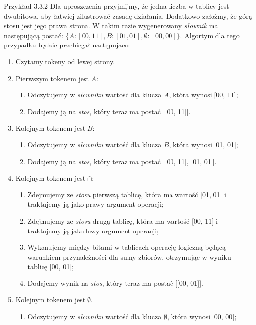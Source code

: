 \documentclass{SGGW-thesis}
\begin{document}
\begin{paragraph}{Przykład 3.3.2\label{ex:3.3.2}}
    Dla uproszczenia przyjmijmy, że jedna liczba w tablicy jest dwubitowa, aby łatwiej zilustrować zasadę działania. Dodatkowo załóżmy, że górą stosu jest jego prawa strona. W takim razie wygenerowany \emph{słownik} ma następującą postać:
    $\{ A: \left[ 00, 11 \right], B: \left[ 01, 01 \right], \emptyset: \left[00, 00 \right]\}$. Algortym dla tego przypadku będzie przebiegał następujaco:
    \begin{enumerate}
        \item Czytamy tokeny od lewej strony.
        \item Pierwszym tokenem jest $A$:
        \begin{enumerate}
            \item Odczytujemy w \emph{słowniku} wartość dla klucza $A$, która wynosi [00, 11];
            \item Dodajemy ją na \emph{stos}, który teraz ma postać [[00, 11]].
        \end{enumerate}
        \item Kolejnym tokenem jest $B$:
        \begin{enumerate}
            \item Odczytujemy w \emph{słowniku} wartość dla klucza $B$, która wynosi [01, 01];
            \item Dodajemy ją na \emph{stos}, który teraz ma postać [[00, 11], [01, 01]].
        \end{enumerate}
        \item Kolejnym tokenem jest $\cap$:
        \begin{enumerate}
            \item Zdejmujemy ze \emph{stosu} pierwszą tablicę, która ma wartość [01, 01] i traktujemy ją jako prawy argument operacji;
            \item Zdejmujemy ze \emph{stosu} drugą tablicę, która ma wartość [00, 11] i traktujemy ją jako lewy argument operacji;
            \item Wykonujemy między bitami w tablicach operację logiczną będącą warunkiem przynależności dla sumy zbiorów, otrzymując w wyniku tablicę [00, 01];
            \item Dodajemy wynik na \emph{stos}, który teraz ma postać [[00, 01]].
        \end{enumerate}
        \item Kolejnym tokenem jest $\emptyset$.
        \begin{enumerate}
            \item Odczytujemy w \emph{słowniku} wartość dla klucza $\emptyset$, która wynosi [00, 00];

\end{enumerate}
\end{enumerate}
\end{paragraph}
\end{document}
